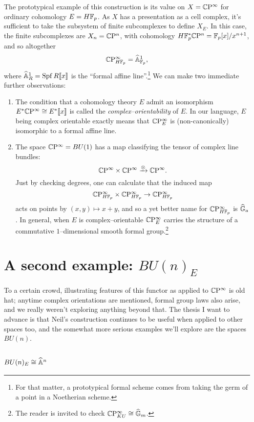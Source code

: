 The prototypical example of this construction is its value on $X = \mathbb{C}\mathrm P^\infty$ for ordinary cohomology $E = H\mathbb F_p$.  As $X$ has a presentation as a cell complex, it's sufficient to take the subsystem of finite subcomplexes to define $X_E$.  In this case, the finite subcomplexes are $X_n = \mathbb{C}\mathrm P^n$, with cohomology $H\mathbb F_p^* \mathbb{C}\mathrm P^n = \mathbb F_p[x] / x^{n+1}$, and so altogether \[\mathbb{C}\mathrm P^\infty_{H\mathbb F_p} = \widehat{\mathbb{A}}^1_{\mathbb F_p},\] where $\widehat{\mathbb{A}}^1_R = \operatorname{Spf} R\llbracket x \rrbracket$ is the ``formal affine line''.\footnote{For that matter, a prototypical formal scheme comes from taking the germ of a point in a Noetherian scheme.}  We can make two immediate further observations:

\begin{enumerate}
\item The condition that a cohomology theory $E$ admit an isomorphism $E^* \mathbb{C}\mathrm P^\infty \cong E^*\llbracket x \rrbracket$ is called the \emph{complex--orientability} of $E$.  In our language, $E$ being complex orientable exactly means that $\mathbb{C}\mathrm P^\infty_E$ is (non-canonically) isomorphic to a formal affine line.
\item The space $\mathbb{C}\mathrm P^\infty = BU(1)$ has a map classifying the tensor of complex line bundles: \[\mathbb{C}\mathrm P^\infty \times \mathbb{C}\mathrm P^\infty \xrightarrow{\otimes} \mathbb{C}\mathrm P^\infty.\]  Just by checking degrees, one can calculate that the induced map \[\mathbb{C}\mathrm P^\infty_{H\mathbb F_p} \times \mathbb{C}\mathrm P^\infty_{H\mathbb F_p} \to \mathbb{C}\mathrm P^\infty_{H\mathbb F_p}\] acts on points by $(x, y) \mapsto x + y$, and so a yet better name for $\mathbb{C}\mathrm P^\infty_{H\mathbb F_p}$ is $\widehat{\mathbb G}_a$.  In general, when $E$ is complex--orientable $\mathbb{C}\mathrm P^\infty_E$ carries the structure of a commutative $1$--dimensional smooth formal group.\footnote{The reader is invited to check $\mathbb{C}\mathrm P^\infty_{KU} \cong \widehat{\mathbb G}_m$.}
\end{enumerate}


\section*{A second example: $BU(n)_E$}

To a certain crowd, illustrating features of this functor as applied to $\mathbb{C}\mathrm P^\infty$ is old hat; anytime complex orientations are mentioned, formal group laws also arise, and we really weren't exploring anything beyond that.  The thesis I want to advance is that Neil's construction continues to be useful when applied to other spaces too, and the somewhat more serious examples we'll explore are the spaces $BU(n)$.

\subsection*{$BU(n)_E \cong \widehat{\mathbb{A}}^n$}

